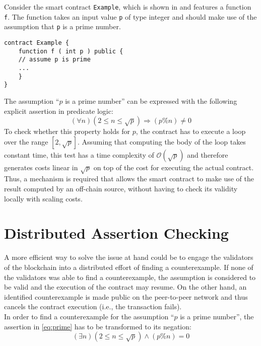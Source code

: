 Consider the smart contract \texttt{Example}, which is shown in  and features a function \texttt{f}. The function takes an input value \texttt{p} of type integer and should make use of the assumption that \texttt{p} is a prime number.
\begin{lstlisting}[caption=Smart contract with a function expecting a prime number \cite{thiemann_2020}, numbers=none, language=Solidity, label=lst:prime]
contract Example {
	function f ( int p ) public {
	// assume p is prime
	...
	}
}
\end{lstlisting}
The assumption ``$p$ is a prime number'' can be expressed with the following explicit assertion in predicate logic: 
\begin{equation}\label{eq:prime}
    (\forall n) (2 \le n \le \sqrt{p}) \Rightarrow (p \% n) \neq 0
\end{equation}
To check whether this property holds for $p$, the contract has to execute a loop over the range $[2, \sqrt{p}]$. Assuming that computing the body of the loop takes constant time, this test has a time complexity of $\mathcal{O}(\sqrt{p})$ and therefore generates costs linear in $\sqrt{p}$ on top of the cost for executing the actual contract. Thus, a mechanism is required that allows the smart contract to make use of the result computed by an off-chain source, without having to check its validity locally with scaling costs.

\section{Distributed Assertion Checking}
A more efficient way to solve the issue at hand could be to engage the validators of the blockchain into a distributed effort of finding a counterexample. If none of the validators was able to find a counterexample, the assumption is considered to be valid and the execution of the contract may resume. On the other hand, an identified counterexample is made public on the peer-to-peer network and thus cancels the contract execution (i.e., the transaction fails). \\
In order to find a counterexample for the assumption ``$p$ is a prime number'', the assertion in \eqref{eq:prime} has to be transformed to its negation:
\begin{equation}\label{eq:prime_neg}
	(\exists n) (2 \le n \le \sqrt{p}) \wedge (p \% n) = 0
\end{equation}

